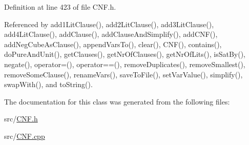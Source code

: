 Definition at line 423 of file C\-N\-F.\-h.



Referenced by add1\-Lit\-Clause(), add2\-Lit\-Clause(), add3\-Lit\-Clause(), add4\-Lit\-Clause(), add\-Clause(), add\-Clause\-And\-Simplify(), add\-C\-N\-F(), add\-Neg\-Cube\-As\-Clause(), append\-Vars\-To(), clear(), C\-N\-F(), contains(), do\-Pure\-And\-Unit(), get\-Clauses(), get\-Nr\-Of\-Clauses(), get\-Nr\-Of\-Lits(), is\-Sat\-By(), negate(), operator=(), operator==(), remove\-Duplicates(), remove\-Smallest(), remove\-Some\-Clause(), rename\-Vars(), save\-To\-File(), set\-Var\-Value(), simplify(), swap\-With(), and to\-String().



The documentation for this class was generated from the following files\-:\begin{DoxyCompactItemize}
\item 
src/\hyperlink{CNF_8h}{C\-N\-F.\-h}\item 
src/\hyperlink{CNF_8cpp}{C\-N\-F.\-cpp}\end{DoxyCompactItemize}
